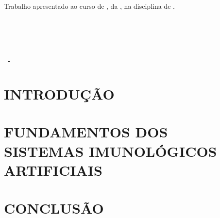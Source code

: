 \documentclass[12pt,a4paper,brazil,openany,oneside]{abntex2}
\begin{document}
\newpage
\begin{titlepage}
    \begin{center}
        \vspace*{\fill}
        \textbf{\large \nomeAutor}\\[0.5cm]
        \textbf{\Large \tituloTrabalho}\\[0.5cm]
        \vfill
        \begin{flushright}
            \begin{minipage}{0.5\textwidth}
                Trabalho apresentado ao curso de \curso, da \faculdade, na disciplina de \disciplina.\\[0.5cm]
            \end{minipage}
        \end{flushright}
        \vfill
        \textbf{\large \fatecName\ \campus}\\[0.5cm]
        \textbf{\large \curso}\\[0.5cm]
        \textbf{\large \disciplina}\\[0.5cm]
        \vfill
        \orientadorTrabalho\\[0.5cm]
        \vfill
        \textbf{\large \cidade \ - \BRName}\\[0.5cm]
        \textbf{\large \the\year}
        \vspace*{\fill}
    \end{center}
\end{titlepage}

\newpage
\pagestyle{empty} %
\tableofcontents

\chapter{\MakeUppercase{Introdução}}
\thispagestyle{mystyle}


\chapter{\MakeUppercase{Fundamentos dos Sistemas Imunológicos Artificiais}}
\thispagestyle{mystyle}


\chapter{\MakeUppercase{Conclusão}}
\thispagestyle{mystyle}



\end{document}
